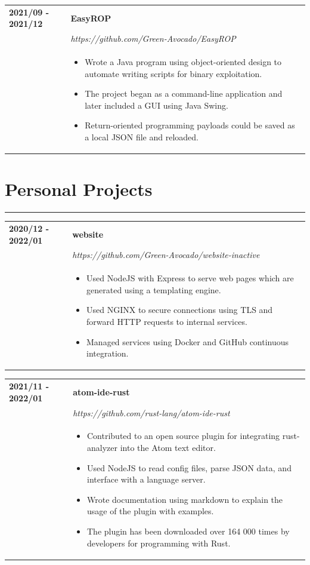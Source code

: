 \documentclass[letterpaper]{article}
\newcommand{\sectcolor}{cyan}
\newcommand{\sect}[1]{\section*{#1}
                        {\color{\sectcolor}
                        \rule{\textwidth}{1pt}
                        \vspace{-4pt}}}
\begin{document}
        \begin{tabular}{p{} p{}}
            \textbf{2021/09 - 2021/12} & \textbf{EasyROP} \\
            & \emph{https://github.com/Green-Avocado/EasyROP} \\
            & \begin{itemize}
                \item Wrote a Java program using object-oriented design to automate writing scripts for
                    binary exploitation.
                \item The project began as a command-line application and later included a GUI using Java
                    Swing.
                \item Return-oriented programming payloads could be saved as a local JSON file and
                    reloaded.
            \end{itemize}
        \end{tabular}

    \sect{Personal Projects}

        \begin{tabular}{p{} p{}}
            \textbf{2020/12 - 2022/01} & \textbf{website} \\
            & \emph{https://github.com/Green-Avocado/website-inactive} \\
            & \begin{itemize}
                \item Used NodeJS with Express to serve web pages which are generated using a templating
                    engine.
                \item Used NGINX to secure connections using TLS and forward HTTP requests to internal
                    services.
                \item Managed services using Docker and GitHub continuous integration.
            \end{itemize}
        \end{tabular}

        \begin{tabular}{p{} p{}}
            \textbf{2021/11 - 2022/01} & \textbf{atom-ide-rust} \\
            & \emph{https://github.com/rust-lang/atom-ide-rust} \\
            & \begin{itemize}
                \item Contributed to an open source plugin for integrating rust-analyzer into the Atom
                    text editor.
                \item Used NodeJS to read config files, parse JSON data, and interface with a language
                    server.
                \item Wrote documentation using markdown to explain the usage of the plugin with examples.
                \item The plugin has been downloaded over 164 000 times by developers for programming with
                    Rust.
            \end{itemize}
        \end{tabular}
\end{document}
